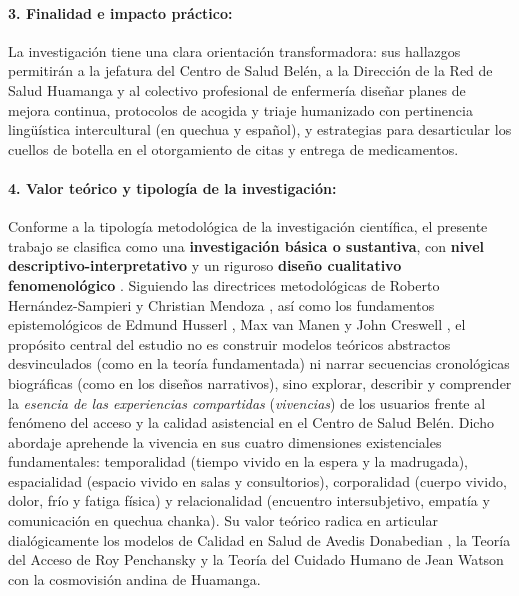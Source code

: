 \paragraph{3. Finalidad e impacto práctico:}
La investigación tiene una clara orientación transformadora: sus hallazgos permitirán a la jefatura del Centro de Salud Belén, a la Dirección de la Red de Salud Huamanga y al colectivo profesional de enfermería diseñar planes de mejora continua, protocolos de acogida y triaje humanizado con pertinencia lingüística intercultural (en quechua y español), y estrategias para desarticular los cuellos de botella en el otorgamiento de citas y entrega de medicamentos.

\paragraph{4. Valor teórico y tipología de la investigación:}
Conforme a la tipología metodológica de la investigación científica, el presente trabajo se clasifica como una \textbf{investigación básica o sustantiva}, con \textbf{nivel descriptivo-interpretativo} y un riguroso \textbf{diseño cualitativo fenomenológico} \cite{sampieri2018, creswell2013}. Siguiendo las directrices metodológicas de Roberto Hernández-Sampieri y Christian Mendoza \cite{sampieri2018}, así como los fundamentos epistemológicos de Edmund Husserl \cite{husserl1949}, Max van Manen \cite{vanmanen1990} y John Creswell \cite{creswell2013}, el propósito central del estudio no es construir modelos teóricos abstractos desvinculados (como en la teoría fundamentada) ni narrar secuencias cronológicas biográficas (como en los diseños narrativos), sino explorar, describir y comprender la \textit{esencia de las experiencias compartidas} (\textit{vivencias}) de los usuarios frente al fenómeno del acceso y la calidad asistencial en el Centro de Salud Belén. Dicho abordaje aprehende la vivencia en sus cuatro dimensiones existenciales fundamentales: temporalidad (tiempo vivido en la espera y la madrugada), espacialidad (espacio vivido en salas y consultorios), corporalidad (cuerpo vivido, dolor, frío y fatiga física) y relacionalidad (encuentro intersubjetivo, empatía y comunicación en quechua chanka). Su valor teórico radica en articular dialógicamente los modelos de Calidad en Salud de Avedis Donabedian \cite{donabedian1980, donabedian2005}, la Teoría del Acceso de Roy Penchansky \cite{penchansky1981} y la Teoría del Cuidado Humano de Jean Watson \cite{watson2008} con la cosmovisión andina de Huamanga.


